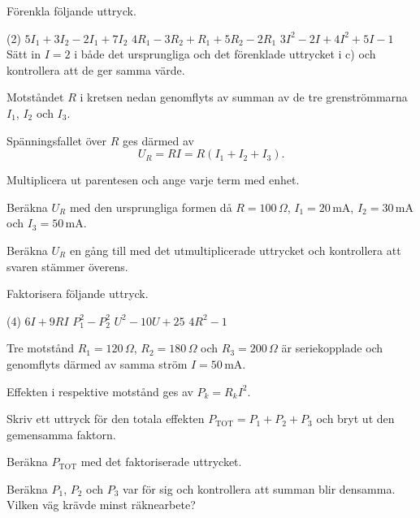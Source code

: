 Förenkla följande uttryck.
\begin{delar}(2)
  \task $5I_1 + 3I_2 - 2I_1 + 7I_2$
  \task $4R_1 - 3R_2 + R_1 + 5R_2 - 2R_1$
  \task $3I^2 - 2I + 4I^2 + 5I - 1$
  \startnewitemline
  \task* Sätt in $I = 2$ i både det ursprungliga och det förenklade uttrycket i c) och kontrollera
    att de ger samma värde.
\end{delar}

Motståndet $R$ i kretsen nedan genomflyts av summan av de tre grenströmmarna $I_1$, $I_2$ och
$I_3$.


Spänningsfallet över $R$ ges därmed av
\[
  U_R = RI = R(I_1 + I_2 + I_3).
\]
\begin{parts}
  \item Multiplicera ut parentesen och ange varje term med enhet.
  \item Beräkna $U_R$ med den ursprungliga formen då $R = 100\,\Omega$, $I_1 = 20\,\text{mA}$,
    $I_2 = 30\,\text{mA}$ och $I_3 = 50\,\text{mA}$.
  \item Beräkna $U_R$ en gång till med det utmultiplicerade uttrycket och kontrollera att svaren
    stämmer överens.
\end{parts}

Faktorisera följande uttryck.
\begin{delar}(4)
  \task $6I + 9RI$
  \task $P_1^2 - P_2^2$
  \task $U^2 - 10U + 25$
  \task $4R^2 - 1$
\end{delar}

Tre motstånd $R_1 = 120\,\Omega$, $R_2 = 180\,\Omega$ och $R_3 = 200\,\Omega$ är seriekopplade och
genomflyts därmed av samma ström $I = 50\,\text{mA}$.


Effekten i respektive motstånd ges av $P_k = R_k I^2$.
\begin{parts}
  \item Skriv ett uttryck för den totala effekten $P_{\text{TOT}} = P_1 + P_2 + P_3$ och bryt ut den
    gemensamma faktorn.
  \item Beräkna $P_{\text{TOT}}$ med det faktoriserade uttrycket.
  \item Beräkna $P_1$, $P_2$ och $P_3$ var för sig och kontrollera att summan blir densamma. Vilken
    väg krävde minst räknearbete?
\end{parts}

